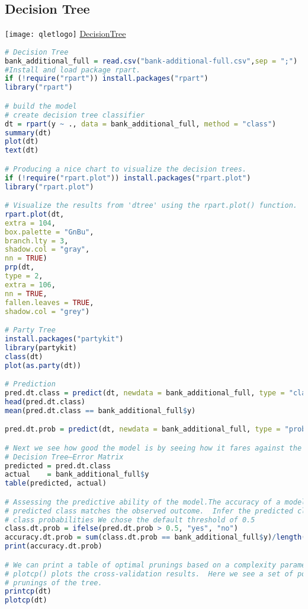 \documentclass[12pt, a4paper, bibliography=totoc, english]{scrartcl}
\begin{document}
\subsection{Decision Tree}
\texttt{[image: qletlogo]}
\textcolor{blue}{\href{https://github.com/JingyiLiu3136/MLFBM/blob/master/decisiontree/SPL_decisiontree.r}{DecisionTree}}
\begin{lstlisting}[language = R]
# Decision Tree
bank_additional_full = read.csv("bank-additional-full.csv",sep = ";")
#Install and load package rpart.
if (!require("rpart")) install.packages("rpart")
library("rpart") 

# build the model
# create decision tree classifier
dt = rpart(y ~ ., data = bank_additional_full, method = "class")  
summary(dt)
plot(dt)
text(dt)

# Producing a nice chart to visualize the decision trees.
if (!require("rpart.plot")) install.packages("rpart.plot")
library("rpart.plot")

# Visualize the results from 'dtree' using the rpart.plot() function.
rpart.plot(dt, 
extra = 104, 
box.palette = "GnBu", 
branch.lty = 3, 
shadow.col = "gray", 
nn = TRUE)
prp(dt, 
type = 2, 
extra = 106, 
nn = TRUE, 
fallen.leaves = TRUE, 
shadow.col = "grey")

# Party Tree
install.packages("partykit")
library(partykit)
class(dt)
plot(as.party(dt))

# Prediction
pred.dt.class = predict(dt, newdata = bank_additional_full, type = "class")
head(pred.dt.class)
mean(pred.dt.class == bank_additional_full$y)

pred.dt.prob = predict(dt, newdata = bank_additional_full, type = "prob")[, 2]

# Next we see how good the model is by seeing how it fares against the test data. Evaluate
# Decision Tree—Error Matrix
predicted = pred.dt.class
actual    = bank_additional_full$y
table(predicted, actual)

# Assessing the predictive ability of the model.The accuracy of a model describes how often the
# predicted class matches the observed outcome.  Infer the predicted class from the predicted
# class probabilities We chose the default threshold of 0.5
class.dt.prob = ifelse(pred.dt.prob > 0.5, "yes", "no")
accuracy.dt.prob = sum(class.dt.prob == bank_additional_full$y)/length(class.dt.prob)
print(accuracy.dt.prob)

# We can print a table of optimal prunings based on a complexity parameter using printcp(). The
# plotcp() plots the cross-validation results.  Here we see a set of possible cost-complexity
# prunings of the tree.
printcp(dt)
plotcp(dt)


\end{lstlisting}
\end{document}
